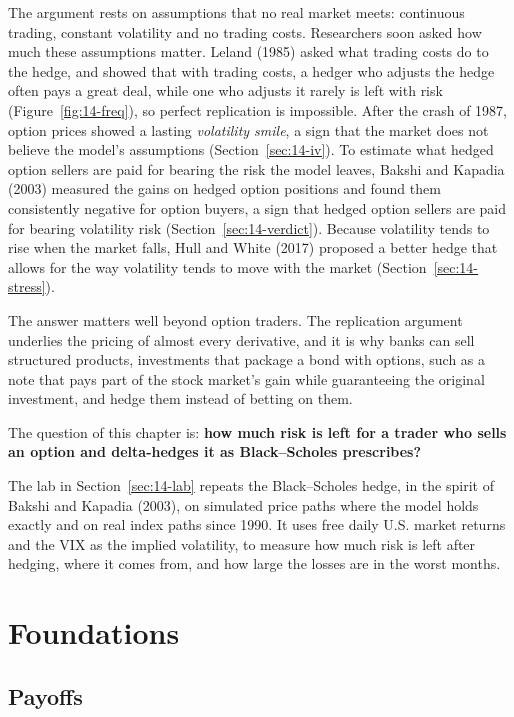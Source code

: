 The argument rests on assumptions that no real market meets: continuous trading, constant volatility and no trading costs. Researchers soon asked how much these assumptions matter. Leland (1985) asked what trading costs do to the hedge, and showed that with trading costs, a hedger who adjusts the hedge often pays a great deal, while one who adjusts it rarely is left with risk (Figure~\ref{fig:14-freq}), so perfect replication is impossible. After the crash of 1987, option prices showed a lasting \emph{volatility smile}, a sign that the market does not believe the model's assumptions (Section~\ref{sec:14-iv}). To estimate what hedged option sellers are paid for bearing the risk the model leaves, Bakshi and Kapadia (2003) measured the gains on hedged option positions and found them consistently negative for option buyers, a sign that hedged option sellers are paid for bearing volatility risk (Section~\ref{sec:14-verdict}). Because volatility tends to rise when the market falls, Hull and White (2017) proposed a better hedge that allows for the way volatility tends to move with the market (Section~\ref{sec:14-stress}).


The answer matters well beyond option traders. The replication argument underlies the pricing of almost every derivative, and it is why banks can sell structured products, investments that package a bond with options, such as a note that pays part of the stock market's gain while guaranteeing the original investment, and hedge them instead of betting on them. 

The question of this chapter is: \textbf{how much risk is left for a trader who sells an option and delta-hedges it as Black--Scholes prescribes?}

The lab in Section~\ref{sec:14-lab} repeats the Black--Scholes hedge, in the spirit of Bakshi and Kapadia (2003), on simulated price paths where the model holds exactly and on real index paths since 1990. It uses free daily U.S. market returns and the VIX as the implied volatility, to measure how much risk is left after hedging, where it comes from, and how large the losses are in the worst months.


\section{Foundations}
\label{sec:14-foundations}

\subsection{Payoffs}

